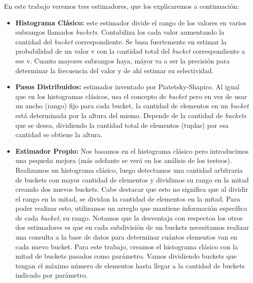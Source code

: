 \quad En este trabajo veremos tres estimadores, que los explicaremos a continuaci\'on:

\begin{itemize}
\item \textbf{Histograma Cl\'asico: } este estimador divide el rango de los valores en varios subrangos llamados \textit{buckets}. Contabiliza los cada valor aumentando la cantidad del \textit{bucket} correspondiente. Se basa fuertemente en estimar la probabilidad de un valor v con la cantidad total del \textit{bucket} correspondiente a ese v. Cuanto mayores subrangos haya, m\'ayor va a ser la precisi\'on para determinar la frecuencia del valor y de ah\'i estimar su selectividad. \\

\item \textbf{Pasos Distribuidos: } estimador inventado por Piatetsky-Shapiro. Al igual que en los histogramas cl\'asicos, usa el concepto de \textit{bucket} pero en vez de usar un ancho (rango) fijo para cada bucket, la cantidad de elementos en un \textit{bucket} est\'a determinada por la altura del mismo. Depende de la cantidad de \textit{buckets} que se desea, dividiendo la cantidad total de elementos (tuplas) por esa cantidad se obtiene la altura.\\

\item \textbf{Estimador Propio: } Nos basamos en el histograma cl\'asico pero introducimos una peque\~na mejora (m\'as adelante se ver\'a en los an\'alisis de los testeos). Realizamos un histograma cl\'asico, luego detectamos una cantidad arbitraria de buckets con mayor cantidad de elementos y dividimos su rango en la mitad creando dos nuevos buckets. Cabe destacar que esto no significa que al dividir el rango en la mitad, se dividan la cantidad de elementos en la mitad. Para poder realizar esto, utilizamos un arreglo que mantiene informaci\'on espec\'ifica de cada \textit{bucket}, su rango. Notamos que la desventaja con respectoa  los otros dos estimadores es que en cada subdivisi\'on de un buckets necesitamos realizar una consulta a la base de datos para determinar cu\'antos elementos van en cada nuevo bucket. Para este trabajo, creamos el histograma cl\'asico con la mitad de buckets pasados como par\'ametro. Vamos dividiendo buckets que tengan el m\'aximo n\'umero de elementos hasta llegar a la cantidad de buckets indicado por par\'ametro.

\end{itemize}
